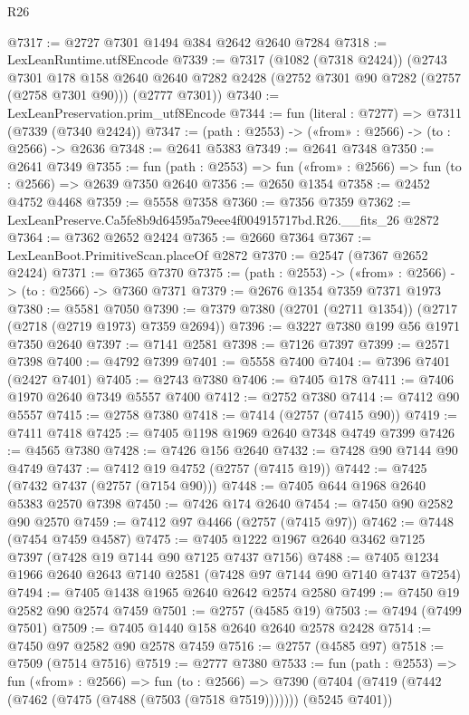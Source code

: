 \begin{lexlean}{R26}
\begin{coremodule}
@7317 := @2727 @7301 @1494 @384 @2642 @2640 @7284
@7318 := LexLeanRuntime.utf8Encode
@7339 := @7317
    (@1082 (@7318 @2424))
    (@2743
      @7301
      @178
      @158
      @2640
      @2640
      @7282
      @2428
      (@2752 @7301 @90 @7282 (@2757 (@2758 @7301 @90)))
      (@2777 @7301))
@7340 := LexLeanPreservation.prim_utf8Encode
@7344 := fun (literal : @7277) => @7311 (@7339 (@7340 @2424))
@7347 := (path : @2553) -> («from» : @2566) -> (to : @2566) -> @2636
@7348 := @2641 @5383
@7349 := @2641 @7348
@7350 := @2641 @7349
@7355 := fun (path : @2553) => fun («from» : @2566) => fun (to : @2566) => @2639 @7350 @2640
@7356 := @2650 @1354
@7358 := @2452 @4752 @4468
@7359 := @5558 @7358
@7360 := @7356 @7359
@7362 := LexLeanPreserve.Ca5fe8b9d64595a79eee4f004915717bd.R26.__fits_26 @2872
@7364 := @7362 @2652 @2424
@7365 := @2660 @7364
@7367 := LexLeanBoot.PrimitiveScan.placeOf @2872
@7370 := @2547 (@7367 @2652 @2424)
@7371 := @7365 @7370
@7375 := (path : @2553) -> («from» : @2566) -> (to : @2566) -> @7360 @7371
@7379 := @2676 @1354 @7359 @7371 @1973
@7380 := @5581 @7050
@7390 := @7379 @7380 (@2701 (@2711 @1354)) (@2717 (@2718 (@2719 @1973) @7359 @2694))
@7396 := @3227 @7380 @199 @56 @1971 @7350 @2640
@7397 := @7141 @2581
@7398 := @7126 @7397
@7399 := @2571 @7398
@7400 := @4792 @7399
@7401 := @5558 @7400
@7404 := @7396 @7401 (@2427 @7401)
@7405 := @2743 @7380
@7406 := @7405 @178
@7411 := @7406 @1970 @2640 @7349 @5557 @7400
@7412 := @2752 @7380
@7414 := @7412 @90 @5557
@7415 := @2758 @7380
@7418 := @7414 (@2757 (@7415 @90))
@7419 := @7411 @7418
@7425 := @7405 @1198 @1969 @2640 @7348 @4749 @7399
@7426 := @4565 @7380
@7428 := @7426 @156 @2640
@7432 := @7428 @90 @7144 @90 @4749
@7437 := @7412 @19 @4752 (@2757 (@7415 @19))
@7442 := @7425 (@7432 @7437 (@2757 (@7154 @90)))
@7448 := @7405 @644 @1968 @2640 @5383 @2570 @7398
@7450 := @7426 @174 @2640
@7454 := @7450 @90 @2582 @90 @2570
@7459 := @7412 @97 @4466 (@2757 (@7415 @97))
@7462 := @7448 (@7454 @7459 @4587)
@7475 := @7405 @1222 @1967 @2640 @3462 @7125 @7397 (@7428 @19 @7144 @90 @7125 @7437 @7156)
@7488 := @7405 @1234 @1966 @2640 @2643 @7140 @2581 (@7428 @97 @7144 @90 @7140 @7437 @7254)
@7494 := @7405 @1438 @1965 @2640 @2642 @2574 @2580
@7499 := @7450 @19 @2582 @90 @2574 @7459
@7501 := @2757 (@4585 @19)
@7503 := @7494 (@7499 @7501)
@7509 := @7405 @1440 @158 @2640 @2640 @2578 @2428
@7514 := @7450 @97 @2582 @90 @2578 @7459
@7516 := @2757 (@4585 @97)
@7518 := @7509 (@7514 @7516)
@7519 := @2777 @7380
@7533 := fun (path : @2553) =>
  fun («from» : @2566) =>
  fun (to : @2566) =>
  @7390 (@7404 (@7419 (@7442 (@7462 (@7475 (@7488 (@7503 (@7518 @7519))))))) (@5245 @7401))

\end{coremodule}
\end{lexlean}
